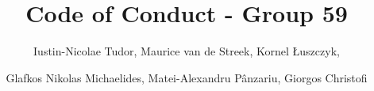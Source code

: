 \documentclass[sigconf,nonacm]{acmart}
\title{Code of Conduct - Group 59}
\author{Iustin-Nicolae Tudor, Maurice van de Streek, Kornel Łuszczyk,}
\author{Glafkos Nikolas Michaelides, Matei-Alexandru Pânzariu, Giorgos Christofi}
\begin{document}

% 

\maketitle

 \smallskip %










\end{document}
